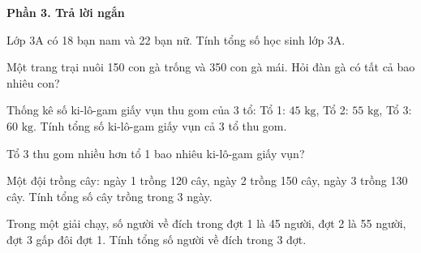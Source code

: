 \textbf{Phần 3. Trả lời ngắn}

\begin{ex} %
Lớp 3A có 18 bạn nam và 22 bạn nữ. Tính tổng số học sinh lớp 3A.
\end{ex}

\begin{ex} %
Một trang trại nuôi 150 con gà trống và 350 con gà mái. Hỏi đàn gà có tất cả bao nhiêu con?
\end{ex}

\begin{ex} %
Thống kê số ki-lô-gam giấy vụn thu gom của 3 tổ: Tổ 1: $45\text{ kg}$, Tổ 2: $55\text{ kg}$, Tổ 3: $60\text{ kg}$. Tính tổng số ki-lô-gam giấy vụn cả 3 tổ thu gom.
\end{ex}

\begin{ex} %
Tổ 3 thu gom nhiều hơn tổ 1 bao nhiêu ki-lô-gam giấy vụn?
\end{ex}

\begin{ex} %
Một đội trồng cây: ngày 1 trồng 120 cây, ngày 2 trồng 150 cây, ngày 3 trồng 130 cây. Tính tổng số cây trồng trong 3 ngày.
\end{ex}

\begin{ex} %
Trong một giải chạy, số người về đích trong đợt 1 là 45 người, đợt 2 là 55 người, đợt 3 gấp đôi đợt 1. Tính tổng số người về đích trong 3 đợt.
\end{ex}
